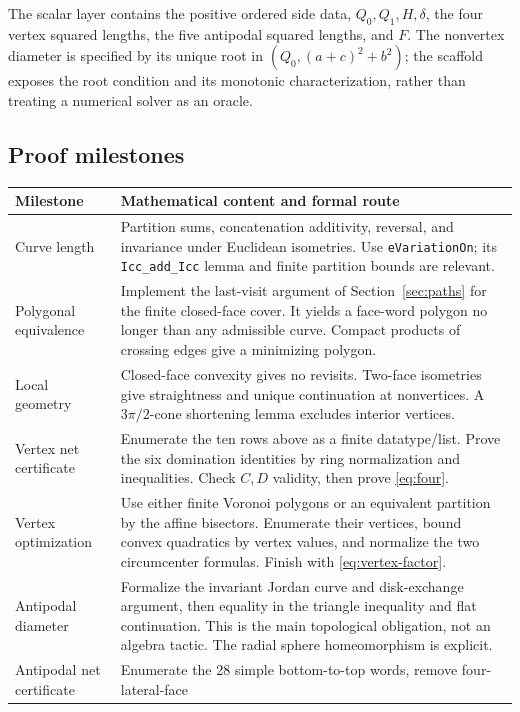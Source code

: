 \documentclass[11pt]{article}
\theoremstyle{definition}
\newcommand{\sqzero}{Q_0}
\newcommand{\sqone}{Q_1}
\begin{document}
The scalar layer contains the positive ordered side data,
\(\sqzero,\sqone,H,\delta\), the four vertex squared lengths,
the five antipodal squared lengths, and \(F\). The nonvertex
diameter is specified by its unique root in
\((\sqzero,(a+c)^2+b^2)\); the scaffold exposes the root condition
and its monotonic characterization, rather than treating a numerical
solver as an oracle.

\subsection{Proof milestones}

\begin{longtable}{p{.23\linewidth} p{.69\linewidth}}
\toprule
Milestone&Mathematical content and formal route\\
\midrule
\endhead
Curve length&
Partition sums, concatenation additivity, reversal, and invariance under
Euclidean isometries. Use \texttt{eVariationOn}; its
\texttt{Icc\_add\_Icc} lemma and finite partition bounds are relevant.
\\[4pt]
Polygonal equivalence&
Implement the last-visit argument of Section~\ref{sec:paths} for the
finite closed-face cover. It yields a face-word polygon no longer
than any admissible curve. Compact products of crossing edges give
a minimizing polygon.
\\[4pt]
Local geometry&
Closed-face convexity gives no revisits. Two-face isometries give
straightness and unique continuation at nonvertices. A
\(3\pi/2\)-cone shortening lemma excludes interior vertices.
\\[4pt]
Vertex net certificate&
Enumerate the ten rows above as a finite datatype/list. Prove the six
domination identities by ring normalization and inequalities.
Check \(C,D\) validity, then prove \eqref{eq:four}.
\\[4pt]
Vertex optimization&
Use either finite Voronoi polygons or an equivalent partition by the
affine bisectors. Enumerate their vertices, bound convex quadratics
by vertex values, and normalize the two circumcenter formulas.
Finish with \eqref{eq:vertex-factor}.
\\[4pt]
Antipodal diameter&
Formalize the invariant Jordan curve and disk-exchange argument,
then equality in the triangle inequality and flat continuation.
This is the main topological obligation, not an algebra tactic.
The radial sphere homeomorphism is explicit.
\\[4pt]
Antipodal net certificate&
Enumerate the 28 simple bottom-to-top words, remove four-lateral-face

\end{longtable}
\end{document}
